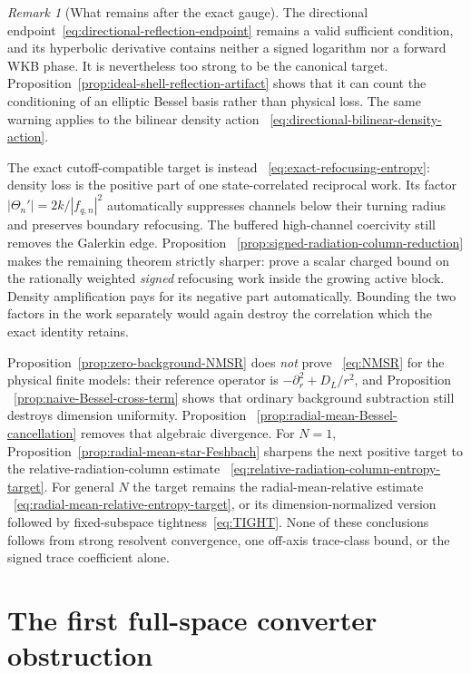 \documentclass[11pt]{article}
\theoremstyle{definition}
\theoremstyle{remark}
\newtheorem{remark}[theorem]{Remark}
\begin{document}
\begin{remark}[What remains after the exact gauge]
The directional endpoint~\eqref{eq:directional-reflection-endpoint} remains a
valid sufficient condition, and its hyperbolic derivative contains neither a
signed logarithm nor a forward WKB phase.  It is nevertheless too strong to be
the canonical target.  Proposition~\ref{prop:ideal-shell-reflection-artifact}
shows that it can count the conditioning of an elliptic Bessel basis rather
than physical loss.  The same warning applies to the bilinear density action
~\eqref{eq:directional-bilinear-density-action}.

The exact cutoff-compatible target is instead
~\eqref{eq:exact-refocusing-entropy}: density loss is the positive part of one
state-correlated reciprocal work.  Its factor
$|\Theta_n'|=2k/|f_{q,n}|^2$ automatically suppresses channels below their
turning radius and preserves boundary refocusing.  The buffered high-channel
coercivity still removes the Galerkin edge.  Proposition
~\ref{prop:signed-radiation-column-reduction} makes the remaining theorem
strictly sharper: prove a scalar charged bound on the rationally weighted
\emph{signed} refocusing work inside the growing active block.  Density
amplification pays for its negative part automatically.  Bounding the two
factors in the work separately would again destroy the correlation which the
exact identity retains.
\end{remark}

Proposition~\ref{prop:zero-background-NMSR} does \emph{not} prove
~\eqref{eq:NMSR} for the physical finite models: their reference operator is
$-\partial_r^2+D_L/r^2$, and Proposition
~\ref{prop:naive-Bessel-cross-term} shows that ordinary background subtraction
still destroys dimension uniformity.  Proposition
~\ref{prop:radial-mean-Bessel-cancellation} removes that algebraic divergence.
For $N=1$, Proposition~\ref{prop:radial-mean-star-Feshbach} sharpens the next
positive target to the relative-radiation-column estimate
~\eqref{eq:relative-radiation-column-entropy-target}.  For general $N$ the
target remains the radial-mean-relative estimate
~\eqref{eq:radial-mean-relative-entropy-target}, or its dimension-normalized
version followed by fixed-subspace tightness~\eqref{eq:TIGHT}.  None of these
conclusions follows from strong resolvent convergence, one off-axis
trace-class bound, or the signed trace coefficient alone.

\section{The first full-space converter obstruction}
\label{app:scalar-converter-obstruction}
\end{document}
